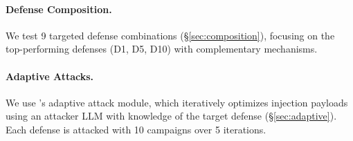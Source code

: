 \paragraph{Defense Composition.}
We test 9 targeted defense combinations (\S\ref{sec:composition}), focusing on the top-performing defenses (D1, D5, D10) with complementary mechanisms.

\paragraph{Adaptive Attacks.}
We use \asb{}'s adaptive attack module, which iteratively optimizes injection payloads using an attacker LLM with knowledge of the target defense (\S\ref{sec:adaptive}).
Each defense is attacked with 10 campaigns over 5 iterations.
